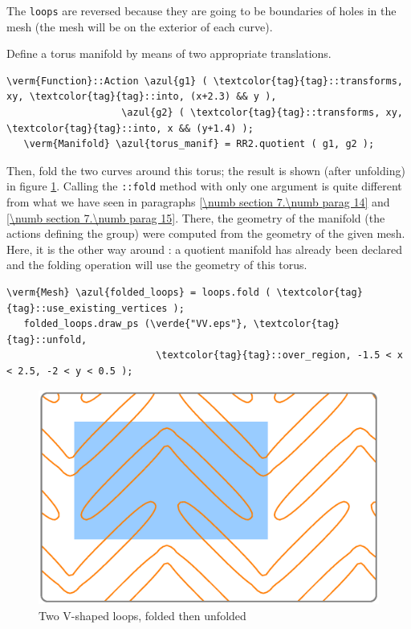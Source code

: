 The {\small\tt loops} are reversed because they are going to be boundaries of holes
in the mesh (the mesh will be on the exterior of each curve).

Define a torus manifold by means of two appropriate translations.

\begin{Verbatim}[commandchars=\\\{\},formatcom=\small\tt,frame=single,
   rulecolor=\color{coment},baselinestretch=0.94,framesep=2mm         ]
   \verm{Function}::Action \azul{g1} ( \textcolor{tag}{tag}::transforms, xy, \textcolor{tag}{tag}::into, (x+2.3) && y ),
                    \azul{g2} ( \textcolor{tag}{tag}::transforms, xy, \textcolor{tag}{tag}::into, x && (y+1.4) );
   \verm{Manifold} \azul{torus_manif} = RR2.quotient ( g1, g2 );
\end{Verbatim}

Then, fold the two curves around this torus; the result is shown (after unfolding) in figure
\ref{\numb section 7.\numb fig 13}.
Calling the {\small\tt{}::fold} method with only one argument is quite different
from what we have seen in paragraphs \ref{\numb section 7.\numb parag 14} and
\ref{\numb section 7.\numb parag 15}.
There, the geometry of the manifold (the actions defining the group) were computed from
the geometry of the given mesh.
Here, it is the other way around : a quotient manifold has already been declared and
the folding operation will use the geometry of this torus.

\begin{Verbatim}[commandchars=\\\{\},formatcom=\small\tt,frame=single,
   rulecolor=\color{coment},baselinestretch=0.94,framesep=2mm         ]
   \verm{Mesh} \azul{folded_loops} = loops.fold ( \textcolor{tag}{tag}::use_existing_vertices );
   folded_loops.draw_ps (\verde{"VV.eps"}, \textcolor{tag}{tag}::unfold,
                          \textcolor{tag}{tag}::over_region, -1.5 < x < 2.5, -2 < y < 0.5 );
\end{Verbatim}

\begin{figure}[ht] \centering
  \includegraphics[width=120mm]{boomerang-2.eps}
  \caption{Two V-shaped loops, folded then unfolded}
  \label{\numb section 7.\numb fig 13}
\end{figure}

